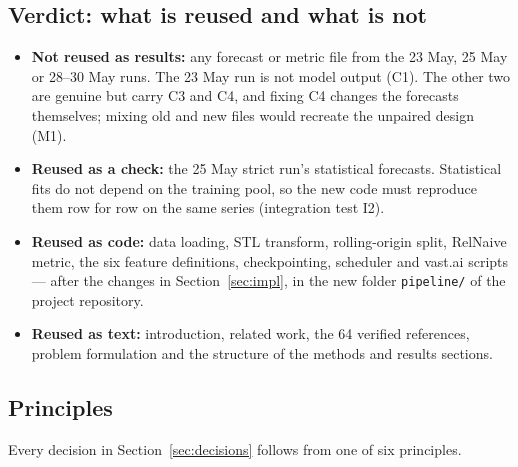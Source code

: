 \documentclass[11pt,a4paper]{article}
\newcommand{\code}[1]{\texttt{#1}}
\begin{document}
\subsection{Verdict: what is reused and what is not}

\begin{itemize}
  \item \textbf{Not reused as results:} any forecast or metric file from the 23 May, 25 May or
  28--30 May runs. The 23 May run is not model output (C1). The other two are genuine but carry C3
  and C4, and fixing C4 changes the forecasts themselves; mixing old and new files would recreate
  the unpaired design (M1).
  \item \textbf{Reused as a check:} the 25 May strict run's statistical forecasts. Statistical fits
  do not depend on the training pool, so the new code must reproduce them row for row on the same
  series (integration test I2).
  \item \textbf{Reused as code:} data loading, STL transform, rolling-origin split, RelNaive metric,
  the six feature definitions, checkpointing, scheduler and vast.ai scripts --- after the changes in
  Section~\ref{sec:impl}, in the new folder \code{pipeline/} of the project repository.
  \item \textbf{Reused as text:} introduction, related work, the 64 verified references, problem
  formulation and the structure of the methods and results sections.
\end{itemize}

\subsection{Principles}\label{sec:principles}

Every decision in Section~\ref{sec:decisions} follows from one of six principles.
\end{document}
